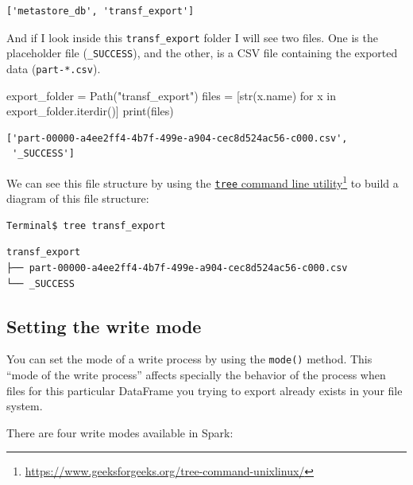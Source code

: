 \documentclass[
  11pt,
  letterpaper,
  DIV=11,
  numbers=noendperiod]{scrreprt}
\newenvironment{Shaded}{\begin{snugshade}}{\end{snugshade}}
\newcommand{\BuiltInTok}[1]{\textcolor[rgb]{0.00,0.23,0.31}{#1}}
\newcommand{\ControlFlowTok}[1]{\textcolor[rgb]{0.00,0.23,0.31}{#1}}
\newcommand{\KeywordTok}[1]{\textcolor[rgb]{0.00,0.23,0.31}{#1}}
\newcommand{\NormalTok}[1]{\textcolor[rgb]{0.00,0.23,0.31}{#1}}
\newcommand{\OperatorTok}[1]{\textcolor[rgb]{0.37,0.37,0.37}{#1}}
\newcommand{\StringTok}[1]{\textcolor[rgb]{0.13,0.47,0.30}{#1}}
\begin{document}
\begin{verbatim}
['metastore_db', 'transf_export']
\end{verbatim}

And if I look inside this \texttt{transf\_export} folder I will see two
files. One is the placeholder file (\texttt{\_SUCCESS}), and the other,
is a CSV file containing the exported data (\texttt{part-*.csv}).

\begin{Shaded}
\begin{Highlighting}[]
\NormalTok{export\_folder }\OperatorTok{=}\NormalTok{ Path(}\StringTok{"transf\_export"}\NormalTok{)}
\NormalTok{files }\OperatorTok{=}\NormalTok{ [}\BuiltInTok{str}\NormalTok{(x.name) }\ControlFlowTok{for}\NormalTok{ x }\KeywordTok{in}\NormalTok{ export\_folder.iterdir()]}
\BuiltInTok{print}\NormalTok{(files)}
\end{Highlighting}
\end{Shaded}

\begin{verbatim}
['part-00000-a4ee2ff4-4b7f-499e-a904-cec8d524ac56-c000.csv', 
 '_SUCCESS']
\end{verbatim}

We can see this file structure by using the
\href{https://www.geeksforgeeks.org/tree-command-unixlinux/}{\texttt{tree}
command line utility}\footnote{\url{https://www.geeksforgeeks.org/tree-command-unixlinux/}}
to build a diagram of this file structure:

\begin{verbatim}
Terminal$ tree transf_export
\end{verbatim}

\begin{verbatim}
transf_export
├── part-00000-a4ee2ff4-4b7f-499e-a904-cec8d524ac56-c000.csv
└── _SUCCESS
\end{verbatim}

\subsection{Setting the write mode}\label{setting-the-write-mode}

You can set the mode of a write process by using the \texttt{mode()}
method. This ``mode of the write process'' affects specially the
behavior of the process when files for this particular DataFrame you
trying to export already exists in your file system.

There are four write modes available in Spark:
\end{document}
